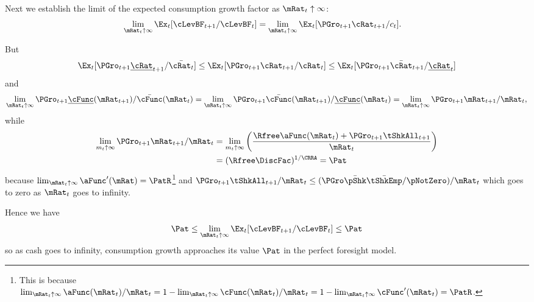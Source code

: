 \documentclass[BufferStockTheory]{subfiles}
\begin{document}
\renewcommand{\figFile}{cFuncBounds}
\hypertarget{\figFile}{}



Next we establish the limit of the expected consumption growth factor
as $\mRat_{t} \uparrow \infty$:
\begin{align}
  \lim_{\mRat_{t} \uparrow \infty} \Ex_{t}[
  \cLevBF_{t+1}/\cLevBF_{t}]  & = \lim_{\mRat_{t} \uparrow \infty} \Ex_{t}[
                                {\PGro}_{t+1} {\cRat}_{t+1}/c_{t}]. \notag
\end{align}

But
\begin{align*}
  \Ex_{t}[{\PGro}_{t+1} {\ushort{\cRat}}_{t+1}/\bar{\cRat_{t}}] \leq \Ex_{t}[{\PGro}_{t+1} {\cRat}_{t+1}/\cRat_{t}] \leq \Ex_{t}[{\PGro}_{t+1} {\bar{\cRat}}_{t+1}/\ushort{\cRat}_{t}]
\end{align*}
and
\begin{equation}  \label{eq:xttoinfty}
  \lim_{\mRat_t \uparrow \infty} \PGro_{t+1}\ushort{\cFunc}(\mRat_{t+1})/\bar{\cFunc}(\mRat_t) =
  \lim_{\mRat_{t} \uparrow \infty} \PGro_{t+1}\bar{\cFunc}(\mRat_{t+1})/\ushort{\cFunc}(\mRat_t) =
  \lim_{\mRat_{t} \uparrow \infty}\PGro_{t+1} \mRat_{t+1}/\mRat_t,  \notag
\end{equation}
while \hypertarget{xtp1toinfty}{}
\begin{align}  \label{eq:xtp1toinfty}
  \lim_{m_{t} \uparrow \infty} \PGro_{t+1} \mRat_{t+1}/\mRat_t  & = \lim_{m_{t} \uparrow \infty}
                                                                  \left(\frac{\Rfree \aFunc(\mRat_t)+{\PGro}_{t+1}\tShkAll_{t+1}}{\mRat_t}\right)
  \\  & = (\Rfree \DiscFac)^{1/\CRRA} = \Pat
\end{align}
because $\lim_{\mRat_{t}\uparrow \infty} \aFunc^{\prime}(\mRat)=\PatR$\footnote{This is because $\lim_{\mRat_{t}\uparrow \infty} \aFunc(\mRat_{t})/\mRat_{t}=1-\lim_{\mRat_{t}\uparrow \infty} \cFunc(\mRat_{t})/\mRat_{t}=1-\lim_{\mRat_{t}\uparrow \infty}\cFunc^{\prime}(\mRat_{t})=\PatR$.} and
$\PGro_{t+1}\tShkAll_{t+1}/\mRat_{t} \leq (\PGro \bar{\pShk} \bar{\tShkEmp}/\pNotZero )/\mRat_{t}$ which
goes to zero as $\mRat_{t}$ goes to infinity.

Hence we have
\begin{equation}
  {\Pat}  \leq \lim_{\mRat_{t} \uparrow \infty} \Ex_{t}[\cLevBF_{t+1}/\cLevBF_{t}] \leq {\Pat} \nonumber
\end{equation}
so as cash goes to infinity, consumption growth approaches its
value $\Pat$ in the perfect foresight model.
\end{document}
